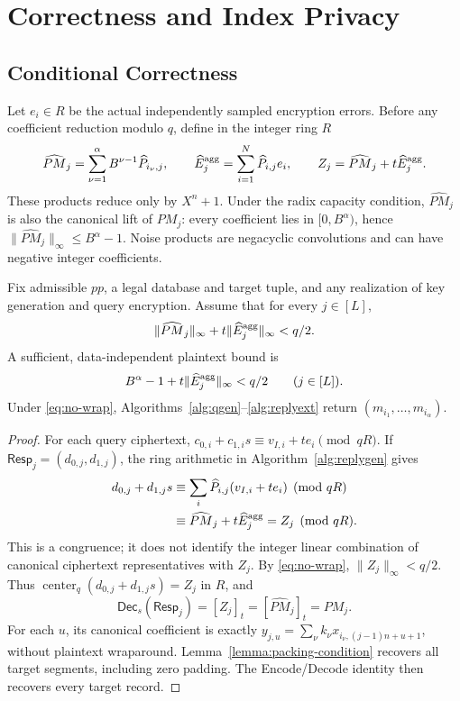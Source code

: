 \section{Correctness and Index Privacy}
\label{sec:security}
\subsection{Conditional Correctness}
\label{sec:corr}
Let \(e_i\in R\) be the actual independently sampled encryption errors.
Before any coefficient reduction modulo \(q\), define in the integer ring \(R\)
\begin{equation}
\label{eq:integer-lifts}
 \widehat{PM}_j=\sum_{\nu=1}^{\alpha}B^{\nu-1}\widehat P_{i_{\nu},j},\qquad
 \widehat E_j^{\rm agg}=\sum_{i=1}^N\widehat P_{i,j}e_i,\qquad
 Z_j=\widehat{PM}_j+t\widehat E_j^{\rm agg}.
\end{equation}
These products reduce only by \(X^n+1\). Under the radix capacity condition,
\(\widehat{PM}_j\) is also the canonical lift of \(PM_j\): every coefficient
lies in \([0,B^\alpha)\), hence
\(\|\widehat{PM}_j\|_\infty\le B^\alpha-1\). Noise products are negacyclic convolutions
and can have negative integer coefficients.

\begin{theorem}
\label{thm:correctness}
Fix admissible \(pp\), a legal database and target tuple, and any realization
of key generation and query encryption. Assume that for every \(j\in[L]\),
\begin{equation}
\label{eq:no-wrap}
 \|\widehat{PM}_j\|_\infty+t\|\widehat E_j^{\rm agg}\|_\infty<q/2.
\end{equation}
A sufficient, data-independent plaintext bound is
\[
 B^\alpha-1+t\|\widehat E_j^{\rm agg}\|_\infty<q/2
 \qquad(j\in[L]).
\]
Under \eqref{eq:no-wrap}, Algorithms~\ref{alg:qgen}--\ref{alg:replyext} return
\((m_{i_1},\ldots,m_{i_\alpha})\).
\end{theorem}
\begin{proof}
For each query ciphertext, \(c_{0,i}+c_{1,i}s\equiv v_{I,i}+te_i\pmod{qR}\).
If \(\mathsf{Resp}_j=(d_{0,j},d_{1,j})\), the ring arithmetic in
Algorithm~\ref{alg:replygen} gives
\begin{align*}
 d_{0,j}+d_{1,j}s
 &\equiv\sum_i\widehat P_{i,j}(v_{I,i}+te_i)\pmod{qR}\\
 &\equiv\widehat{PM}_j+t\widehat E_j^{\rm agg}=Z_j\pmod{qR}.
\end{align*}
This is a congruence; it does not identify the integer linear combination
of canonical ciphertext representatives with \(Z_j\).
By \eqref{eq:no-wrap}, \(\|Z_j\|_\infty<q/2\). Thus
\(\operatorname{center}_q(d_{0,j}+d_{1,j}s)=Z_j\) in \(R\), and
\[
 \mathsf{Dec}_s(\mathsf{Resp}_j)=[Z_j]_t
    =[\widehat{PM}_j]_t=PM_j.
\]
For each \(u\), its canonical coefficient is exactly
\(y_{j,u}=\sum_{\nu}k_{\nu}x_{i_{\nu},(j-1)n+u+1}\), without plaintext wraparound.
Lemma~\ref{lemma:packing-condition} recovers all target segments, including
zero padding. The Encode/Decode identity then recovers every target record.
\end{proof}

